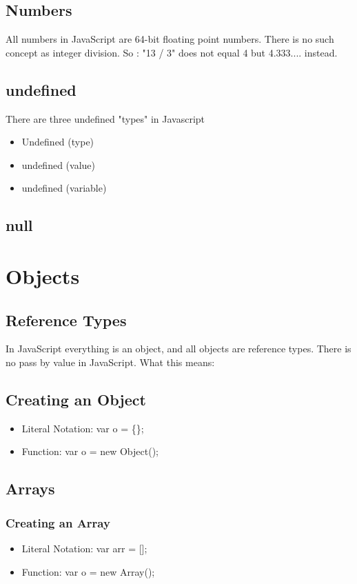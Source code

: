 \documentclass {article}
\begin{document}
\subsection{Numbers}
	All numbers in JavaScript are 64-bit floating point numbers.  There is no such concept as integer division.  So :  "13 / 3" does not equal 4 but 4.333.... instead.

\subsection {undefined}
	There are three undefined "types" in Javascript 
	\begin{itemize}
		\item Undefined (type)
		\item undefined (value)
		\item undefined (variable)
	\end{itemize}


\subsection {null}


\section{Objects}
	\subsection {Reference Types}
		In JavaScript everything is an object, and all objects are reference types.  There is no pass by value in JavaScript.  
		What this means: 
	
	\subsection{Creating an Object}
		\begin{itemize}
			\item Literal Notation: var o = \{\};
			\item Function: var o = new Object();
		\end{itemize}		

	\subsection{Arrays}
		\subsubsection {Creating an Array}
			\begin{itemize}
				\item Literal Notation: var arr = [];
				\item Function: var o = new Array();
			\end{itemize}
	
\end{document}
